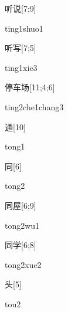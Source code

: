 \begin{verbete}{听说}[7;9]
\begin{pronuncia}{ting1shuo1}
\end{pronuncia}
\end{verbete}

\begin{verbete}{听写}[7;5]
\begin{pronuncia}{ting1xie3}
\end{pronuncia}
\end{verbete}

\begin{verbete}{停车场}[11;4;6]
\begin{pronuncia}[\\]{ting2che1chang3}
\end{pronuncia}
\end{verbete}

\begin{verbete}[tong1]{通}[10]
\begin{pronuncia}{tong1}
\end{pronuncia}
\end{verbete}

\begin{verbete}[tong2]{同}[6]
\begin{pronuncia}{tong2}
\end{pronuncia}
\end{verbete}

\begin{verbete}[tong2wu1]{同屋}[6;9]
\begin{pronuncia}{tong2wu1}
\end{pronuncia}
\end{verbete}

\begin{verbete}{同学}[6;8]
\begin{pronuncia}{tong2xue2}
\end{pronuncia}
\end{verbete}

\begin{verbete}[tou2]{头}[5]
\begin{pronuncia}{tou2}
\end{pronuncia}
\end{verbete}

